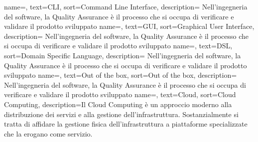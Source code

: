 {
	name=,
	text=CLI,
	sort=Command Line Interface,
	description={ Nell'ingegneria del software, la Quality Assurance è il processo che si occupa di verificare e validare il prodotto sviluppato}
}
{
	name=,
	text=GUI,
	sort=Graphical User Interface,
	description={ Nell'ingegneria del software, la Quality Assurance è il processo che si occupa di verificare e validare il prodotto sviluppato}
}
{
	name=,
	text=DSL,
	sort=Domain Specific Language,
	description={ Nell'ingegneria del software, la Quality Assurance è il processo che si occupa di verificare e validare il prodotto sviluppato}
}
{
	name=,
	text=Out of the box,
	sort=Out of the box,
	description={ Nell'ingegneria del software, la Quality Assurance è il processo che si occupa di verificare e validare il prodotto sviluppato}
}
{
	name=,
	text=Cloud,
	sort=Cloud Computing,
	description={Il Cloud Computing è un approccio moderno alla distribuzione dei servizi e alla gestione dell’infrastruttura. Sostanzialmente si tratta di affidare la gestione fisica dell’infrastruttura a piattaforme specializzate che la erogano come servizio.}
}